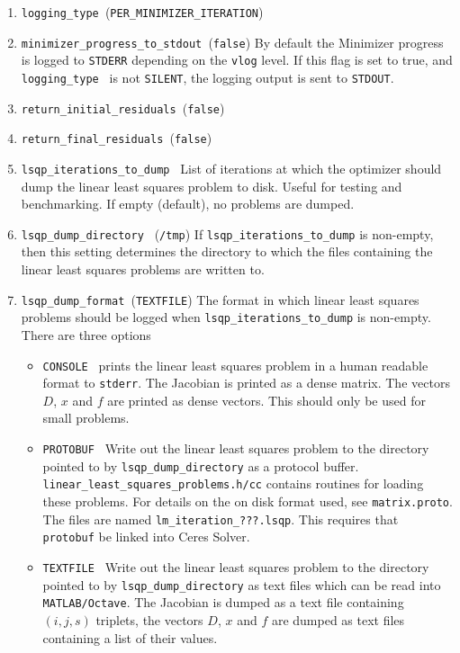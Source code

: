 \begin{enumerate}
\item{\texttt{logging\_type }}(\texttt{PER\_MINIMIZER\_ITERATION})


\item{\texttt{minimizer\_progress\_to\_stdout }}(\texttt{false})
By default the Minimizer progress is logged to \texttt{STDERR} depending on the \texttt{vlog} level. If this flag is
set to true, and \texttt{logging\_type } is not \texttt{SILENT}, the logging output
is sent to \texttt{STDOUT}.

\item{\texttt{return\_initial\_residuals }}(\texttt{false})
\item{\texttt{return\_final\_residuals }}(\texttt{false})


\item{\texttt{lsqp\_iterations\_to\_dump }}
 List of iterations at which the optimizer should dump the
     linear least squares problem to disk. Useful for testing and
     benchmarking. If empty (default), no problems are dumped.

\item{\texttt{lsqp\_dump\_directory }} (\texttt{/tmp})
 If \texttt{lsqp\_iterations\_to\_dump} is non-empty, then this setting determines the directory to which the files containing the linear least squares problems are written to.


\item{\texttt{lsqp\_dump\_format }}(\texttt{TEXTFILE}) The format in which linear least squares problems should be logged
when \texttt{lsqp\_iterations\_to\_dump} is non-empty.  There are three options
\begin{itemize}
\item{\texttt{CONSOLE }} prints the linear least squares problem in a human readable format
  to \texttt{stderr}. The Jacobian is printed as a dense matrix. The vectors
   $D$, $x$ and $f$ are printed as dense vectors. This should only be used
   for small problems.
\item{\texttt{PROTOBUF }}  
   Write out the linear least squares problem to the directory
   pointed to by \texttt{lsqp\_dump\_directory} as a protocol
   buffer. \texttt{linear\_least\_squares\_problems.h/cc} contains routines for
   loading these problems. For details on the on disk format used,
   see \texttt{matrix.proto}. The files are named \texttt{lm\_iteration\_???.lsqp}. This requires that \texttt{protobuf} be linked into Ceres Solver.
\item{\texttt{TEXTFILE }}
   Write out the linear least squares problem to the directory
   pointed to by \texttt{lsqp\_dump\_directory} as text files
   which can be read into \texttt{MATLAB/Octave}. The Jacobian is dumped as a
   text file containing $(i,j,s)$ triplets, the vectors $D$, $x$ and $f$ are
   dumped as text files containing a list of their values.
  

\end{itemize}
\end{enumerate}
